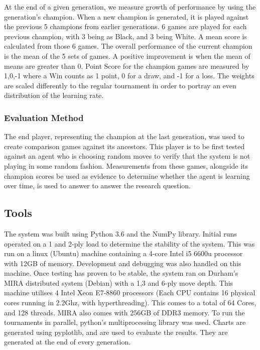 \documentclass[12pt,a4paper]{article}
\begin{document}
        At the end of a given generation, we measure growth of performance by using the generation's champion. When a new champion is generated, it is played against the previous 5 champions from earlier generations. 6 games are played for each previous champion, with 3 being as Black, and 3 being White. A mean score is calculated from those 6 games. The overall performance of the current champion is the mean of the 5 sets of games. A positive improvement is when the mean of means are greater than 0. Point Score for the champion games are measured by {1,0,-1} where a Win counts as 1 point, 0 for a draw, and -1 for a loss. The weights are scaled differently to the regular tournament in order to portray an even distribution of the learning rate.
    
        \subsubsection*{Evaluation Method}
    
        The end player, representing the champion at the last generation, was used to create comparison games against its ancestors. This player is to be first tested against an agent who is choosing random moves to verify that the system is not playing in some random fashion. Measurements from these games, alongside its champion scores be used as evidence to determine whether the agent is learning over time, is used to answer to answer the research question.
       
    \subsection{Tools}
        The system was built using Python 3.6 and the NumPy library. Initial runs operated on a 1 and 2-ply load to determine the stability of the system. This was run on a linux (Ubuntu) machine containing a 4-core Intel i5 6600u processor with 12GB of memory. Development and debugging was also handled on this machine. Once testing has proven to be stable, the system ran on Durham's MIRA distributed system (Debian) with a 1,3 and 6-ply move depth. This machine utilises 4 Intel Xeon E7-8860 processors (Each CPU contains 16 physical cores running in 2.2Ghz, with hyperthreading). This comes to a total of 64 Cores, and 128 threads. MIRA also comes with 256GB of DDR3 memory. To run the tournaments in parallel, python's multiprocessing library was used. Charts are generated using pyplotlib, and are used to evaluate the results. They are generated at the end of every generation.
        
\end{document}
